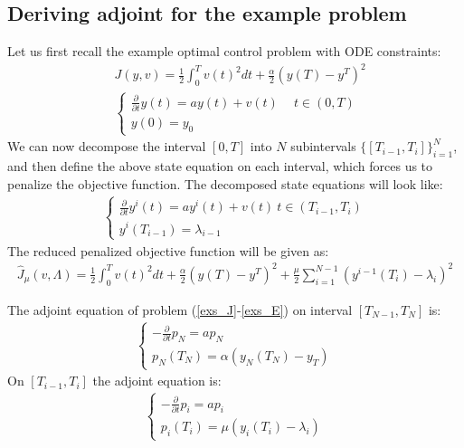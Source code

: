 \subsection{Deriving adjoint for the example problem}
Let us first recall the example optimal control problem with ODE constraints:
\begin{align*}
&J(y,v) = \frac{1}{2}\int_0^Tv(t)^2dt + \frac{\alpha}{2}(y(T)-y^T)^2 \\
&\left\{
     \begin{array}{lr}
       	\frac{\partial}{\partial t}y(t)=a y(t) + v(t) \ \quad t\in(0,T)\\
       	y(0)=y_0
     \end{array}
   \right.
\end{align*}
We can now decompose the interval $[0,T]$ into $N$ subintervals $\{[T_{i-1},T_{i}]\}_{i=1}^{N}$, and then define the above state equation on each interval, which forces us to penalize the objective function. The decomposed state equations will look like:
\begin{align}
\left\{
     \begin{array}{lr}
       	\frac{\partial}{\partial t} y^i(t)=a y^i(t) + v(t) \ t\in(T_{i-1},T_{i})\\
       	y^i(T_{i-1})=\lambda_{i-1}
     \end{array}
   \right. \label{decomp_E}
\end{align}
The reduced penalized objective function will be given as:
\begin{align}
\hat J_{\mu}(v,\Lambda) = \frac{1}{2}\int_0^Tv(t)^2dt + \frac{\alpha}{2}(y(T)-y^T)^2 + \frac{\mu}{2}\sum_{i=1}^{N-1}(y^{i-1}(T_i)-\lambda_i)^2 \label{penalty_func}
\end{align}
\begin{theorem}
The adjoint equation of problem (\ref{exs_J}-\ref{exs_E}) on interval $[T_{N-1},T_N]$ is:
\begin{align}
\left\{
     \begin{array}{lr}
	-\frac{\partial }{\partial t}p_N =a p_N  \\
	p_N(T_{N}) = \alpha( y_N(T_{N})-y_T)
	\end{array}
   \right. \label{end adjoint}
\end{align}
On $[T_{i-1},T_i]$ the adjoint equation is:
\begin{align}
\left\{
     \begin{array}{lr}
	-\frac{\partial }{\partial t}p_i =ap_i  \\
	p_i(T_{i}) = \mu(y_{i}(T_{i})-\lambda_{i} )
	\end{array}
   \right. \label{exs_adjoint}
\end{align}
\end{theorem} 
